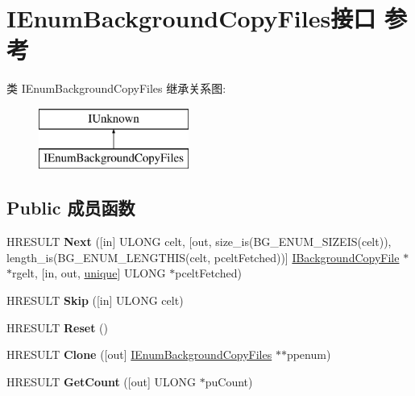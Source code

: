 \hypertarget{interface_i_enum_background_copy_files}{}\section{I\+Enum\+Background\+Copy\+Files接口 参考}
\label{interface_i_enum_background_copy_files}
类 I\+Enum\+Background\+Copy\+Files 继承关系图\+:\begin{figure}[H]
\begin{center}
\leavevmode
\includegraphics[height=2.000000cm]{interface_i_enum_background_copy_files}
\end{center}
\end{figure}
\subsection*{Public 成员函数}
\begin{DoxyCompactItemize}
\item 
\mbox{\label{interface_i_enum_background_copy_files_ac2bbdc1deb7eb45263caf9469274e031}} 
H\+R\+E\+S\+U\+LT {\bfseries Next} (\mbox{[}in\mbox{]} U\+L\+O\+NG celt, \mbox{[}out, size\+\_\+is(B\+G\+\_\+\+E\+N\+U\+M\+\_\+\+S\+I\+Z\+E\+IS(celt)), length\+\_\+is(B\+G\+\_\+\+E\+N\+U\+M\+\_\+\+L\+E\+N\+G\+T\+H\+IS(celt, pcelt\+Fetched))\mbox{]} \hyperlink{interface_i_background_copy_file}{I\+Background\+Copy\+File} $\ast$$\ast$rgelt, \mbox{[}in, out, \hyperlink{interfaceunique}{unique}\mbox{]} U\+L\+O\+NG $\ast$pcelt\+Fetched)
\item 
\mbox{\label{interface_i_enum_background_copy_files_a163502c77fec12f92c3069fc6d56d74c}} 
H\+R\+E\+S\+U\+LT {\bfseries Skip} (\mbox{[}in\mbox{]} U\+L\+O\+NG celt)
\item 
\mbox{\label{interface_i_enum_background_copy_files_aade3c764bb817f1ce6b83cd420ef4d2c}} 
H\+R\+E\+S\+U\+LT {\bfseries Reset} ()
\item 
\mbox{\label{interface_i_enum_background_copy_files_a91a8407efe84bb0ee4ec0d523f9f05b2}} 
H\+R\+E\+S\+U\+LT {\bfseries Clone} (\mbox{[}out\mbox{]} \hyperlink{interface_i_enum_background_copy_files}{I\+Enum\+Background\+Copy\+Files} $\ast$$\ast$ppenum)
\item 
\mbox{\label{interface_i_enum_background_copy_files_a712fd9410f71af4ebf43f38292624788}} 
H\+R\+E\+S\+U\+LT {\bfseries Get\+Count} (\mbox{[}out\mbox{]} U\+L\+O\+NG $\ast$pu\+Count)
\end{DoxyCompactItemize}
